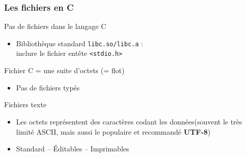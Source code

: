 \documentclass[table,handout,tikz,12pt,svgnames]{beamer}
\subtitle{\Huge Les Fichiers en C}
\date{CM5}
\begin{document}
\begin{frame}
	\titlepage
\end{frame}



\begin{frame}[fragile=singleslide]
	\frametitle{Les fichiers en C}
		\begin{block}{Pas de fichiers dans le langage C}
			\begin{itemize}
				\item Bibliothèque standard \texttt{libc.so/libc.a} :\\inclure le fichier entête \texttt{<stdio.h>}
			\end{itemize}
		\end{block}
		\begin{block}{Fichier C = une suite d'octets (= flot)}
			\begin{itemize}
			\item Pas de fichiers typés
			\end{itemize}
		\end{block}
		\begin{block}{Fichiers texte}
			\begin{itemize}
				\item Les octets représentent des caractères codant les données\footnotesize(souvent le très limité ASCII, mais aussi le populaire et recommandé \textbf{UTF-8})
				\small
				\item Standard -- Éditables -- Imprimables
			\end{itemize}
		\end{block}
\end{frame}
\end{document}
